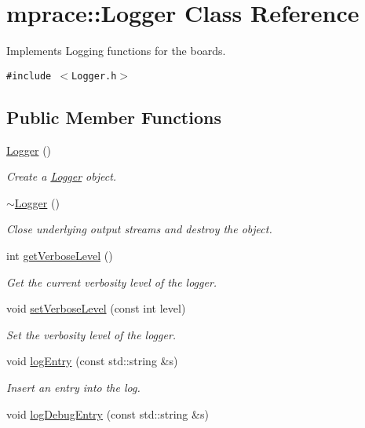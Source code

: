 \hypertarget{classmprace_1_1Logger}{
\section{mprace::Logger Class Reference}
\label{classmprace_1_1Logger}
}
Implements Logging functions for the boards.  


{\tt \#include $<$Logger.h$>$}

\subsection*{Public Member Functions}
\begin{CompactItemize}
\item 
\hyperlink{classmprace_1_1Logger_a0}{Logger} ()
\begin{CompactList}\small\item\em Create a \hyperlink{classmprace_1_1Logger}{Logger} object. \item\end{CompactList}\item 
\hyperlink{classmprace_1_1Logger_a1}{$\sim$Logger} ()
\begin{CompactList}\small\item\em Close underlying output streams and destroy the object. \item\end{CompactList}\item 
int \hyperlink{classmprace_1_1Logger_a2}{get\-Verbose\-Level} ()
\begin{CompactList}\small\item\em Get the current verbosity level of the logger. \item\end{CompactList}\item 
void \hyperlink{classmprace_1_1Logger_a3}{set\-Verbose\-Level} (const int level)
\begin{CompactList}\small\item\em Set the verbosity level of the logger. \item\end{CompactList}\item 
\hypertarget{classmprace_1_1Logger_a4}{
void \hyperlink{classmprace_1_1Logger_a4}{log\-Entry} (const std::string \&s)}
\label{classmprace_1_1Logger_a4}

\begin{CompactList}\small\item\em Insert an entry into the log. \item\end{CompactList}\item 
\hypertarget{classmprace_1_1Logger_a5}{
void \hyperlink{classmprace_1_1Logger_a5}{log\-Debug\-Entry} (const std::string \&s)}
\label{classmprace_1_1Logger_a5}


\end{CompactItemize}
